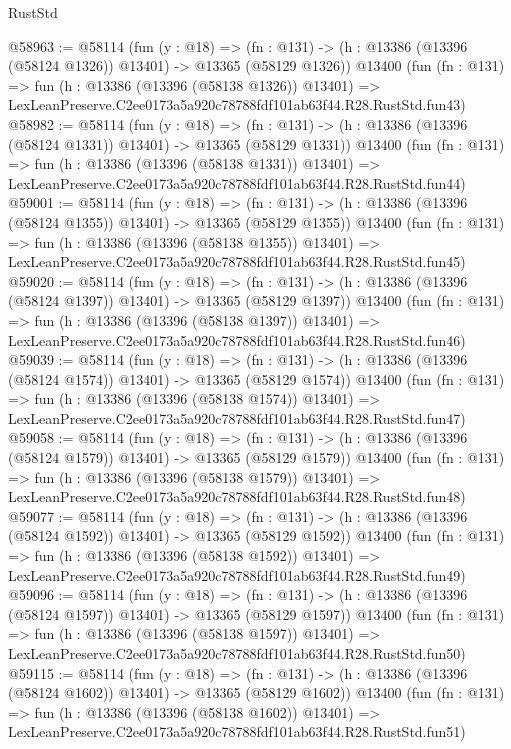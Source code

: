 \begin{lexlean}{RustStd}
\begin{coremodule}
@58963 := @58114
    (fun (y : @18) =>
    (fn : @131) -> (h : @13386 (@13396 (@58124 @1326)) @13401) -> @13365 (@58129 @1326))
    @13400
    (fun (fn : @131) =>
    fun (h : @13386 (@13396 (@58138 @1326)) @13401) =>
    LexLeanPreserve.C2ee0173a5a920c78788fdf101ab63f44.R28.RustStd.fun43)
@58982 := @58114
    (fun (y : @18) =>
    (fn : @131) -> (h : @13386 (@13396 (@58124 @1331)) @13401) -> @13365 (@58129 @1331))
    @13400
    (fun (fn : @131) =>
    fun (h : @13386 (@13396 (@58138 @1331)) @13401) =>
    LexLeanPreserve.C2ee0173a5a920c78788fdf101ab63f44.R28.RustStd.fun44)
@59001 := @58114
    (fun (y : @18) =>
    (fn : @131) -> (h : @13386 (@13396 (@58124 @1355)) @13401) -> @13365 (@58129 @1355))
    @13400
    (fun (fn : @131) =>
    fun (h : @13386 (@13396 (@58138 @1355)) @13401) =>
    LexLeanPreserve.C2ee0173a5a920c78788fdf101ab63f44.R28.RustStd.fun45)
@59020 := @58114
    (fun (y : @18) =>
    (fn : @131) -> (h : @13386 (@13396 (@58124 @1397)) @13401) -> @13365 (@58129 @1397))
    @13400
    (fun (fn : @131) =>
    fun (h : @13386 (@13396 (@58138 @1397)) @13401) =>
    LexLeanPreserve.C2ee0173a5a920c78788fdf101ab63f44.R28.RustStd.fun46)
@59039 := @58114
    (fun (y : @18) =>
    (fn : @131) -> (h : @13386 (@13396 (@58124 @1574)) @13401) -> @13365 (@58129 @1574))
    @13400
    (fun (fn : @131) =>
    fun (h : @13386 (@13396 (@58138 @1574)) @13401) =>
    LexLeanPreserve.C2ee0173a5a920c78788fdf101ab63f44.R28.RustStd.fun47)
@59058 := @58114
    (fun (y : @18) =>
    (fn : @131) -> (h : @13386 (@13396 (@58124 @1579)) @13401) -> @13365 (@58129 @1579))
    @13400
    (fun (fn : @131) =>
    fun (h : @13386 (@13396 (@58138 @1579)) @13401) =>
    LexLeanPreserve.C2ee0173a5a920c78788fdf101ab63f44.R28.RustStd.fun48)
@59077 := @58114
    (fun (y : @18) =>
    (fn : @131) -> (h : @13386 (@13396 (@58124 @1592)) @13401) -> @13365 (@58129 @1592))
    @13400
    (fun (fn : @131) =>
    fun (h : @13386 (@13396 (@58138 @1592)) @13401) =>
    LexLeanPreserve.C2ee0173a5a920c78788fdf101ab63f44.R28.RustStd.fun49)
@59096 := @58114
    (fun (y : @18) =>
    (fn : @131) -> (h : @13386 (@13396 (@58124 @1597)) @13401) -> @13365 (@58129 @1597))
    @13400
    (fun (fn : @131) =>
    fun (h : @13386 (@13396 (@58138 @1597)) @13401) =>
    LexLeanPreserve.C2ee0173a5a920c78788fdf101ab63f44.R28.RustStd.fun50)
@59115 := @58114
    (fun (y : @18) =>
    (fn : @131) -> (h : @13386 (@13396 (@58124 @1602)) @13401) -> @13365 (@58129 @1602))
    @13400
    (fun (fn : @131) =>
    fun (h : @13386 (@13396 (@58138 @1602)) @13401) =>
    LexLeanPreserve.C2ee0173a5a920c78788fdf101ab63f44.R28.RustStd.fun51)

\end{coremodule}
\end{lexlean}
